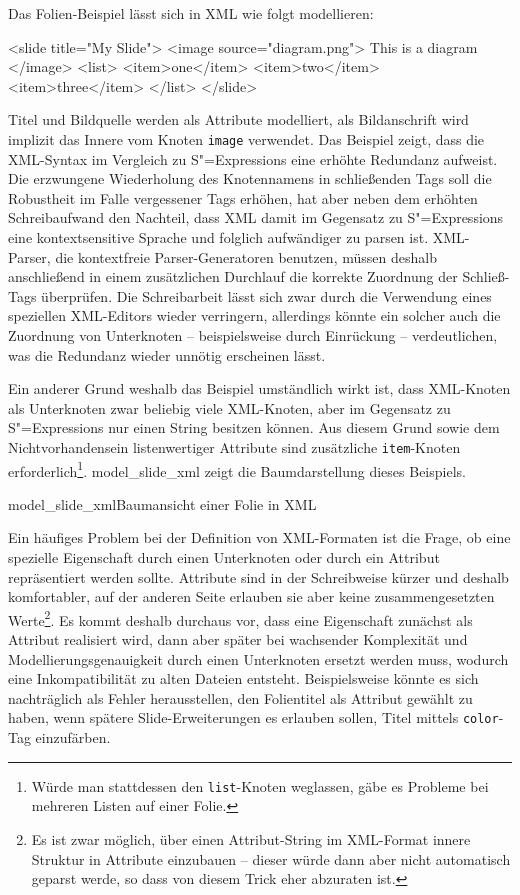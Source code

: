 \documentclass[12pt, a4paper, bibgerm]{scrbook}
\newenvironment{DIFnomarkup}{}{}
\newcommand\icode[1]{\lstinline?#1?}
\newcommand\abb{}
\newcommand\fig{}
\newcommand{\sexps}{S"=Expressions}
\begin{document}
Das Folien-Beispiel lässt sich in XML wie folgt modellieren:
\begin{DIFnomarkup}\begin{code}
<slide title="My Slide">
  <image source="diagram.png">
    This is a diagram
  </image>
  <list>
    <item>one</item>
    <item>two</item>
    <item>three</item>
  </list>
</slide>
\end{code}\end{DIFnomarkup} %
Titel und Bildquelle werden als Attribute modelliert, als
Bildanschrift wird implizit das Innere vom Knoten \icode{image}
verwendet. Das Beispiel zeigt, dass die XML-Syntax im Vergleich zu
\sexps{} eine erhöhte Redundanz aufweist. Die erzwungene Wiederholung
des Knotennamens in schließenden Tags soll die Robustheit im Falle
vergessener Tags erhöhen, hat aber neben dem erhöhten Schreibaufwand den
Nachteil, dass XML damit im Gegensatz zu \sexps{} eine kontextsensitive
Sprache und folglich aufwändiger zu parsen ist. XML-Parser, die
kontextfreie Parser-Generatoren benutzen, müssen deshalb anschließend in
einem zusätzlichen Durchlauf die korrekte Zuordnung der Schließ-Tags
überprüfen. Die Schreibarbeit lässt sich zwar durch die Verwendung eines
speziellen XML-Editors wieder verringern, allerdings könnte ein solcher
auch die Zuordnung von Unterknoten -- beispielsweise durch Einrückung -- 
verdeutlichen, was die Redundanz wieder unnötig erscheinen lässt.

Ein anderer Grund weshalb das Beispiel umständlich wirkt ist, dass
XML-Knoten als Unterknoten zwar beliebig viele XML-Knoten, aber im
Gegensatz zu \sexps{} nur einen String besitzen können. Aus diesem Grund
sowie dem Nichtvorhandensein listenwertiger Attribute sind zusätzliche
\icode{item}-Knoten erforderlich\footnote{Würde man stattdessen den
\icode{list}-Knoten weglassen, gäbe es Probleme bei mehreren Listen auf
einer Folie.}. \abb{model_slide_xml} zeigt die Baumdarstellung dieses
Beispiels.

\fig{model_slide_xml}{Baumansicht einer Folie in XML}

Ein häufiges Problem bei der Definition von XML-Formaten ist die Frage,
ob eine spezielle Eigenschaft durch einen Unterknoten oder durch ein
Attribut repräsentiert werden sollte. Attribute sind in der Schreibweise
kürzer und deshalb komfortabler, auf der anderen Seite erlauben sie aber
keine zusammengesetzten Werte\footnote{Es ist zwar möglich, über einen
  Attribut-String im XML-Format innere Struktur in Attribute einzubauen
  -- dieser würde dann aber nicht automatisch geparst werde, so dass von
  diesem Trick eher abzuraten ist.}. Es kommt deshalb durchaus vor, dass
eine Eigenschaft zunächst als Attribut realisiert wird, dann aber später
bei wachsender Komplexität und Modellierungsgenauigkeit durch einen
Unterknoten ersetzt werden muss, wodurch eine Inkompatibilität zu alten
Dateien entsteht. Beispielsweise könnte es sich nachträglich als Fehler
herausstellen, den Folientitel als Attribut gewählt zu haben, wenn
spätere Slide-Erweiterungen es erlauben sollen, Titel mittels
\icode{color}-Tag einzufärben.
\end{document}
